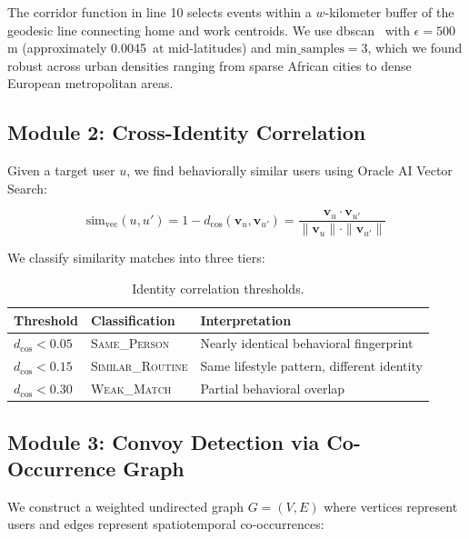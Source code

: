 \documentclass[11pt,a4paper]{article}
\begin{document}
The corridor function in line 10 selects events within a $w$-kilometer buffer of the geodesic line connecting home and work centroids. We use \gls{dbscan}~\cite{ester1996dbscan} with $\epsilon = 500$m (approximately 0.0045\degree\ at mid-latitudes) and $\text{min\_samples} = 3$, which we found robust across urban densities ranging from sparse African cities to dense European metropolitan areas.

\subsection{Module 2: Cross-Identity Correlation}
\label{sec:cross_identity}

Given a target user $u$, we find behaviorally similar users using Oracle AI Vector Search:

\begin{equation}
\label{eq:vector_sim}
\text{sim}_{\text{vec}}(u, u') = 1 - d_{\cos}(\mathbf{v}_u, \mathbf{v}_{u'}) = \frac{\mathbf{v}_u \cdot \mathbf{v}_{u'}}{\|\mathbf{v}_u\| \cdot \|\mathbf{v}_{u'}\|}
\end{equation}

We classify similarity matches into three tiers:

\begin{table}[ht]
\centering
\caption{Identity correlation thresholds.}
\label{tab:correlation_thresholds}
\begin{tabular}{lll}
\toprule
\textbf{Threshold} & \textbf{Classification} & \textbf{Interpretation} \\
\midrule
$d_{\cos} < 0.05$ & \textsc{Same\_Person} & Nearly identical behavioral fingerprint \\
$d_{\cos} < 0.15$ & \textsc{Similar\_Routine} & Same lifestyle pattern, different identity \\
$d_{\cos} < 0.30$ & \textsc{Weak\_Match} & Partial behavioral overlap \\
\bottomrule
\end{tabular}
\end{table}

\subsection{Module 3: Convoy Detection via Co-Occurrence Graph}
\label{sec:convoy}

We construct a weighted undirected graph $G = (V, E)$ where vertices represent users and edges represent spatiotemporal co-occurrences:
\end{document}
